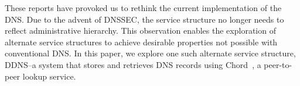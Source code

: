 These reports have provoked us to rethink the current 
implementation of the DNS. 
Due to the advent of DNSSEC, the service structure no longer needs
to reflect administrative hierarchy. 
This observation enables the exploration of alternate service 
structures to achieve desirable properties not possible
with conventional DNS.  In this paper, we explore one such
alternate service structure, DDNS--a system that stores and retrieves
DNS records using Chord~\cite{chord:sigcomm}, a peer-to-peer
lookup service.

